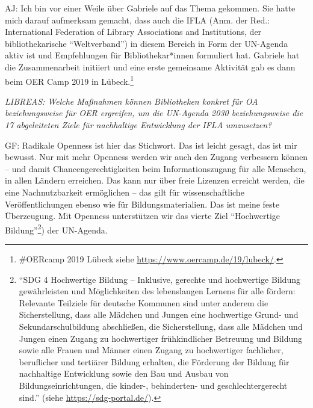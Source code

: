 \documentclass[a4paper,
fontsize=11pt,
oneside,
numbers=noperiodatend,
parskip=half-,
bibliography=totoc,
final
]{scrartcl}
\begin{document}
AJ: Ich bin vor einer Weile über Gabriele auf das Thema gekommen. Sie
hatte mich darauf aufmerksam gemacht, dass auch die IFLA (Anm. der Red.:
International Federation of Library Associations and Institutions, der
bibliothekarische \enquote{Weltverband}) in diesem Bereich in Form der
UN-Agenda aktiv ist und Empfehlungen für Bibliothekar*innen formuliert
hat. Gabriele hat die Zusammenarbeit initiiert und eine erste gemeinsame
Aktivität gab es dann beim OER Camp 2019 in Lübeck.\footnote{\#OERcamp
  2019 Lübeck siehe \url{https://www.oercamp.de/19/lubeck/}.}

\emph{LIBREAS: Welche Maßnahmen können Bibliotheken konkret für OA
beziehungsweise für OER ergreifen, um die UN-Agenda 2030 beziehungsweise
die 17 abgeleiteten Ziele für nachhaltige Entwicklung der IFLA
umzusetzen?}

GF: Radikale Openness ist hier das Stichwort. Das ist leicht gesagt, das
ist mir bewusst. Nur mit mehr Openness werden wir auch den Zugang
verbessern können -- und damit Chancengerechtigkeiten beim
Informationszugang für alle Menschen, in allen Ländern erreichen. Das
kann nur über freie Lizenzen erreicht werden, die eine Nachnutzbarkeit
ermöglichen -- das gilt für wissenschaftliche Veröffentlichungen ebenso
wie für Bildungsmaterialien. Das ist meine feste Überzeugung. Mit
Openness unterstützen wir das vierte Ziel \enquote{Hochwertige
Bildung}\footnote{\enquote{SDG 4 Hochwertige Bildung -- Inklusive, gerechte
  und hochwertige Bildung gewährleisten und Möglichkeiten des
  lebenslangen Lernens für alle fördern: Relevante Teilziele für
  deutsche Kommunen sind unter anderem die Sicherstellung, dass alle
  Mädchen und Jungen eine hochwertige Grund- und Sekundarschulbildung
  abschließen, die Sicherstellung, dass alle Mädchen und Jungen einen
  Zugang zu hochwertiger frühkindlicher Betreuung und Bildung sowie alle
  Frauen und Männer einen Zugang zu hochwertiger fachlicher, beruflicher
  und tertiärer Bildung erhalten, die Förderung der Bildung für
  nachhaltige Entwicklung sowie den Bau und Ausbau von
  Bildungseinrichtungen, die kinder-, behinderten- und
  geschlechtergerecht sind.} (siehe \url{https://sdg-portal.de/}).})
der UN-Agenda.
\end{document}
